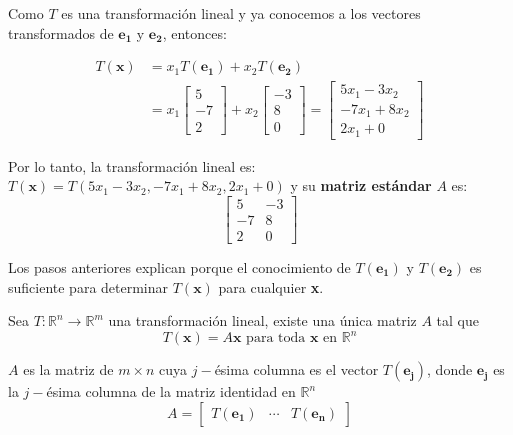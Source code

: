 \documentclass{article}
\begin{document}
Como $T$ es una transformación lineal y ya conocemos a los vectores transformados de $\mathbf{e_1}$ y $\mathbf{e_2}$, entonces:

\begin{equation*}
    \begin{aligned}
        T(\mathbf{x}) &= x_1T(\mathbf{e_1}) + x_2T(\mathbf{e_2}) \\
        &= x_1 \left[\begin{array}{r}
        5 \\ -7 \\ 2
        \end{array}\right]
        + x_2 \left[\begin{array}{r}
            -3 \\ 8 \\ 0
        \end{array}\right] 
        = \left[\begin{array}{r}
            5x_1 - 3x_2 \\ -7x_1 + 8x_2 \\ 2x_1 + 0
        \end{array}\right]
    \end{aligned}
\end{equation*}

Por lo tanto, la transformación lineal es: $T(\mathbf{x}) = T( 5x_1 - 3x_2, -7x_1 + 8x_2, 2x_1 + 0)$ y su \textbf{matriz estándar} $A$ es: $$\left[\begin{array}{rr} 5 &-3 \\ -7 & 8 \\ 2 & 0 \end{array}\right]$$

Los pasos anteriores explican porque el conocimiento de $T(\mathbf{e_1})$ y $T(\mathbf{e_2})$ es suficiente para determinar $T(\mathbf{x})$ para cualquier \textbf{x}.

\begin{tcolorbox}[colback=red!10!white, colframe=red!70!black, title=Matriz Estándar]
    Sea $T: \mathbb{R}^n \rightarrow \mathbb{R}^m$ una transformación lineal, existe una única matriz $A$ tal que $$T(\mathbf{x}) = A\mathbf{x} \text{ para toda } \textbf{x} \text{ en } \mathbb{R}^n$$
    
    $A$ es la matriz de $m \times n$ cuya $j-$ésima columna es el vector $T(\mathbf{e_j})$, donde $\mathbf{e_j}$ es la $j-$ésima columna de la matriz identidad en $\mathbb{R}^n$ $$A = \begin{bmatrix}
        T(\mathbf{e_1}) &\dotsb &T(\mathbf{e_n})
    \end{bmatrix}$$
\end{tcolorbox}
\end{document}
